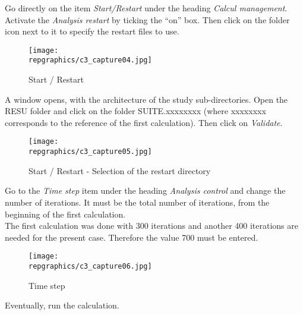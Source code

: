 Go directly on the item {\itshape Start/Restart} under the heading
{\itshape Calcul management}.  Activate the {\itshape Analysis restart}
by ticking the ``on'' box. Then click on the folder icon next to it to specify
the restart files to use.

\begin{figure}[h!]
\begin{center}
\texttt{[image: \\repgraphics/c3\_capture04.jpg]} 
\caption{Start / Restart}
\label{fig4_e3}
\end{center}
\end{figure}


\newpage
A window opens, with the architecture of the study sub-directories. Open the
RESU folder and click on the folder SUITE.xxxxxxxx (where xxxxxxxx corresponds
to the reference of the first calculation). Then click on {\itshape Validate}.

\begin{figure}[h!]
\begin{center}
\texttt{[image: \\repgraphics/c3\_capture05.jpg]} 
\caption{Start / Restart - Selection of the restart directory}
\label{fig5_e3}
\end{center}
\end{figure}


\newpage
Go to the {\itshape Time step} item under the heading {\itshape Analysis
control} and change the number of iterations. It must be the total number of
iterations, from the beginning of the first calculation.\\

The first calculation was done with 300 iterations and another 400 iterations
are needed for the present case. Therefore the value 700 must be entered. 

\begin{figure}[h!]
\begin{center}
\texttt{[image: \\repgraphics/c3\_capture06.jpg]} 
\caption{Time step}
\label{fig6_e3}
\end{center}
\end{figure}

Eventually, run the calculation.
